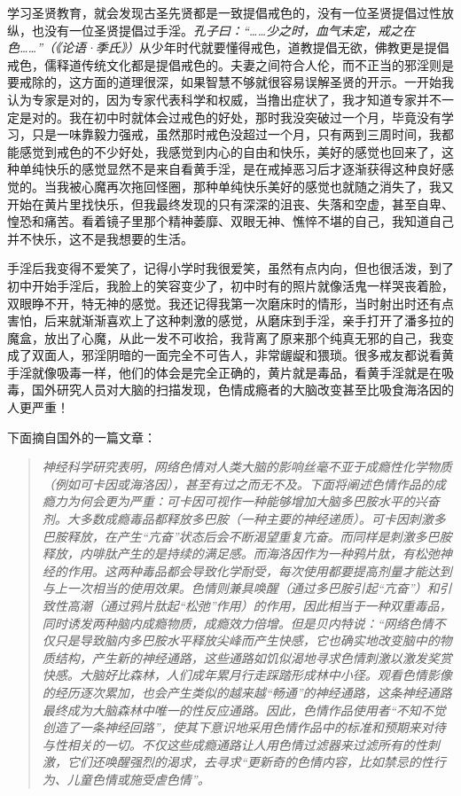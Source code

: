 学习圣贤教育，就会发现古圣先贤都是一致提倡戒色的，没有一位圣贤提倡过性放纵，也没有一位圣贤提倡过手淫。\textit{孔子曰：“……少之时，血气未定，戒之在色……”（《论语·季氏》）}从少年时代就要懂得戒色，道教提倡无欲，佛教更是提倡戒色，儒释道传统文化都是提倡戒色的。夫妻之间符合人伦，而不正当的邪淫则是要戒除的，这方面的道理很深，如果智慧不够就很容易误解圣贤的开示。一开始我认为专家是对的，因为专家代表科学和权威，当撸出症状了，我才知道专家并不一定是对的。我在初中时就体会过戒色的好处，那时我没突破过一个月，毕竟没有学习，只是一味靠毅力强戒，虽然那时戒色没超过一个月，只有两到三周时间，我都能感觉到戒色的不少好处，我感觉到内心的自由和快乐，美好的感觉也回来了，这种单纯快乐的感觉显然不是来自看黄手淫，是在戒掉恶习后才逐渐获得这种良好感觉的。当我被心魔再次拖回怪圈，那种单纯快乐美好的感觉也就随之消失了，我又开始在黄片里找快乐，但我最终发现的只有深深的沮丧、失落和空虚，甚至自卑、惶恐和痛苦。看着镜子里那个精神萎靡、双眼无神、憔悴不堪的自己，我知道自己并不快乐，这不是我想要的生活。

手淫后我变得不爱笑了，记得小学时我很爱笑，虽然有点内向，但也很活泼，到了初中开始手淫后，我脸上的笑容变少了，初中时有的照片就像活鬼一样哭丧着脸，双眼睁不开，特无神的感觉。我还记得我第一次磨床时的情形，当时射出时还有点害怕，后来就渐渐喜欢上了这种刺激的感觉，从磨床到手淫，亲手打开了潘多拉的魔盒，放出了心魔，从此一发不可收拾，我背离了原来那个纯真无邪的自己，我变成了双面人，邪淫阴暗的一面完全不可告人，非常龌龊和猥琐。很多戒友都说看黄手淫就像吸毒一样，他们的体会是完全正确的，黄片就是毒品，看黄手淫就是在吸毒，国外研究人员对大脑的扫描发现，色情成瘾者的大脑改变甚至比吸食海洛因的人更严重！

下面摘自国外的一篇文章：

\begin{quote}\it
    神经科学研究表明，网络色情对人类大脑的影响丝毫不亚于成瘾性化学物质（例如可卡因或海洛因），甚至有过之而无不及。下面将阐述色情作品的成瘾力为何会更为严重：可卡因可视作一种能够增加大脑多巴胺水平的兴奋剂。大多数成瘾毒品都释放多巴胺（一种主要的神经递质）。可卡因刺激多巴胺释放，在产生“亢奋”状态后会不断渴望重复亢奋。而同样是刺激多巴胺释放，内啡肽产生的是持续的满足感。而海洛因作为一种鸦片肽，有松弛神经的作用。这两种毒品都会导致化学耐受，每次使用都要提高剂量才能达到与上一次相当的使用效果。色情则兼具唤醒（通过多巴胺引起“亢奋”）和引致性高潮（通过鸦片肽起“松弛”作用）的作用，因此相当于一种双重毒品，同时诱发两种脑内成瘾物质，成瘾效力倍增。但是贝内特说：“网络色情不仅只是导致脑内多巴胺水平释放尖峰而产生快感，它也确实地改变脑中的物质结构，产生新的神经通路，这些通路如饥似渴地寻求色情刺激以激发奖赏快感。大脑好比森林，人们成年累月行走踩踏形成林中小径。观看色情影像的经历逐次累加，也会产生类似的越来越“畅通”的神经通路，这条神经通路最终成为大脑森林中唯一的性反应通路。因此，色情作品使用者“不知不觉创造了一条神经回路”，使其下意识地采用色情作品中的标准和预期来对待与性相关的一切。不仅这些成瘾通路让人用色情过滤器来过滤所有的性刺激，它们还唤醒强烈的渴求，去寻求“更新奇的色情内容，比如禁忌的性行为、儿童色情或施受虐色情”。
\end{quote}

